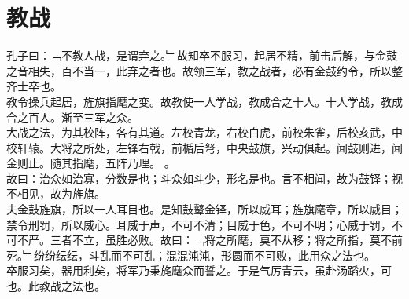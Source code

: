 \chapter{教战}%
孔子曰：﹁不教人战，是谓弃之。﹂故知卒不服习，起居不精，前击后解，与金鼓之音相失，百不当一，此弃之者也。故领三军，教之战者，必有金鼓约令，所以整齐士卒也。\\
教令操兵起居，旌旗指麾之变。故教使一人学战，教成合之十人。十人学战，教成合之百人。渐至三军之众。\\
大战之法，为其校阵，各有其道。左校青龙，右校白虎，前校朱雀，后校亥武，中校轩辕。大将之所处，左锋右戟，前楯后弩，中央鼓旗，兴动俱起。闻鼓则进，闻金则止。随其指麾，五阵乃理。
。\\
故曰：治众如治寡，分数是也；斗众如斗少，形名是也。言不相闻，故为鼓铎；视不相见，故为旌旗。\\
夫金鼓旌旗，所以一人耳目也。是知鼓鼙金铎，所以威耳；旌旗麾章，所以威目；禁令刑罚，所以威心。耳威于声，不可不清；目威于色，不可不明；心威于罚，不可不严。三者不立，虽胜必败。故曰：﹁将之所麾，莫不从移；将之所指，莫不前死。﹂纷纷纭纭，斗乱而不可乱；混混沌沌，形圆而不可败，此用众之法也。\\
卒服习矣，器用利矣，将军乃秉旄麾众而誓之。于是气厉青云，虽赴汤蹈火，可也。此教战之法也。
%
%

